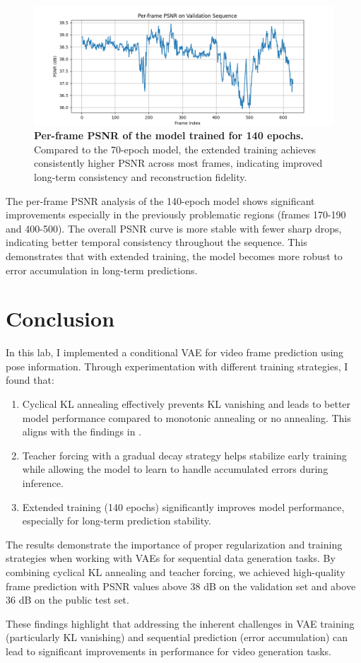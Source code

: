 \documentclass[twocolumn,a4paper]{article}
\begin{document}
\begin{figure}[H]
\centering
\includegraphics[width=0.95\linewidth]{figures/val_140_frame_psnr}
\caption{\textbf{Per-frame PSNR of the model trained for 140 epochs.} Compared to the 70-epoch model, the extended training achieves consistently higher PSNR across most frames, indicating improved long-term consistency and reconstruction fidelity.}
\label{fig:val140framepsnr}
\end{figure}

The per-frame PSNR analysis of the 140-epoch model shows significant improvements especially in the previously problematic regions (frames 170-190 and 400-500). The overall PSNR curve is more stable with fewer sharp drops, indicating better temporal consistency throughout the sequence. This demonstrates that with extended training, the model becomes more robust to error accumulation in long-term predictions.

\section{Conclusion}
In this lab, I implemented a conditional VAE for video frame prediction using pose information. Through experimentation with different training strategies, I found that:

\begin{enumerate}
    \item Cyclical KL annealing effectively prevents KL vanishing and leads to better model performance compared to monotonic annealing or no annealing. This aligns with the findings in \cite{fu2019cyclical}.
    \item Teacher forcing with a gradual decay strategy helps stabilize early training while allowing the model to learn to handle accumulated errors during inference.
    \item Extended training (140 epochs) significantly improves model performance, especially for long-term prediction stability.
\end{enumerate}

The results demonstrate the importance of proper regularization and training strategies when working with VAEs for sequential data generation tasks. By combining cyclical KL annealing and teacher forcing, we achieved high-quality frame prediction with PSNR values above 38 dB on the validation set and above 36 dB on the public test set.

These findings highlight that addressing the inherent challenges in VAE training (particularly KL vanishing) and sequential prediction (error accumulation) can lead to significant improvements in performance for video generation tasks.

\printbibliography
\end{document}
